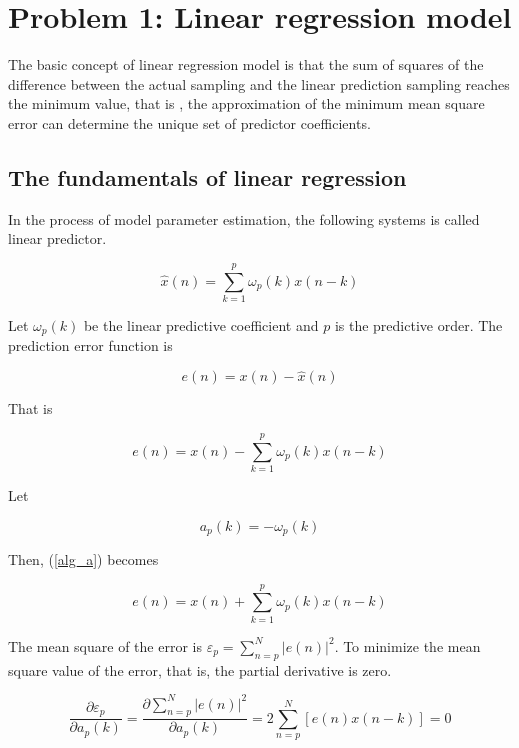 \documentclass{mcmthesis}
\begin{document}
\section{Problem 1: Linear regression model}

The basic concept of linear regression model is that the sum of squares of the difference between the actual sampling and the linear prediction sampling reaches the minimum value, that is , the approximation of the minimum mean square error can determine the unique set of predictor coefficients.\cite{}

\subsection{The fundamentals of linear regression}

In the process of model parameter estimation, the following systems is called linear predictor.

\begin{equation}
  \hat{x}(n)=\sum_{k=1}^{p} \omega_{p}(k) x(n-k)
\end{equation}

Let $\omega_{p}(k)$ be the linear predictive coefficient and $p$ is the predictive order. The prediction error function is

\begin{equation}
  e(n)=x(n)-\hat{x}(n)
\end{equation}

That is

\begin{equation}
  e(n)=x(n)-\sum_{k=1}^{p} \omega_{p}(k) x(n-k)
  \label{alg_a}
\end{equation}

Let

\begin{equation}
  a_{p}(k)=-\omega_{p}(k)
\end{equation}

Then, (\ref{alg_a}) becomes

\begin{equation}
  e(n)=x(n)+\sum_{k=1}^{p} \omega_{p}(k) x(n-k)
  \label{alg_b}
\end{equation}

The mean square of the error is $\varepsilon_{p}=\sum_{n=p}^{N}|e(n)|^{2}$. To minimize the mean square value of the error, that is, the partial derivative is zero.

\begin{equation}
  \frac{\partial \varepsilon_{p}}{\partial a_{p}(k)}=\frac{\partial \sum_{n=p}^{N}|e(n)|^{2}}{\partial a_{p}(k)}=2 \sum_{n=p}^{N}[e(n) x(n-k)]=0
  \label{alg_c}
\end{equation}
\end{document}
